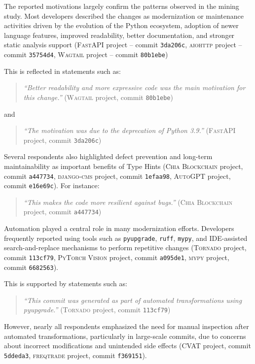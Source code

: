 The reported motivations largely confirm the patterns observed in the mining study. Most developers described the changes as modernization or maintenance activities driven by the evolution of the Python ecosystem, adoption of newer language features, improved readability, better documentation, and stronger static analysis support (\textsc{FastAPI} project -- commit \texttt{3da206c},
\textsc{aiohttp} project -- commit \texttt{35754d4},
\textsc{Wagtail} project -- commit \texttt{80b1ebe})

This is reflected in statements such as:
\begin{quote}
\textit{``Better readability and more expressive code was the main motivation for this change.''} (\textsc{Wagtail} project, commit \texttt{80b1ebe})
\end{quote}

and

\begin{quote}
\textit{``The motivation was due to the deprecation of Python 3.9.''} (\textsc{FastAPI} project, commit \texttt{3da206c})
\end{quote}

Several respondents also highlighted defect prevention and long-term maintainability as important benefits of Type Hints (\textsc{Chia Blockchain} project, commit \texttt{a447734}, \textsc{django-cms} project, commit \texttt{1efaa98}, \textsc{AutoGPT} project, commit \texttt{e16e69c}). For instance:
\begin{quote}
\textit{``This makes the code more resilient against bugs.''} (\textsc{Chia Blockchain} project, commit \texttt{a447734})
\end{quote}

Automation played a central role in many modernization efforts. Developers frequently reported using tools such as \texttt{pyupgrade}, \texttt{ruff}, \texttt{mypy}, and IDE-assisted search-and-replace mechanisms to perform repetitive changes (\textsc{Tornado} project, commit \texttt{113cf79}, \textsc{PyTorch Vision} project, commit \texttt{a095de1}, \textsc{mypy} project, commit \texttt{6682563}).

This is supported by statements such as:
\begin{quote}
\textit{``This commit was generated as part of automated transformations using pyupgrade.''} (\textsc{Tornado} project, commit \texttt{113cf79})
\end{quote}

However, nearly all respondents emphasized the need for manual inspection after automated transformations, particularly in large-scale commits, due to concerns about incorrect modifications and unintended side effects (\textsc{CVAT} project, commit \texttt{5ddeda3}, \textsc{freqtrade} project, commit \texttt{f369151}).

